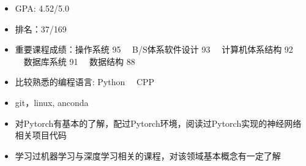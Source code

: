 

\begin{itemize}
  \item GPA: 4.52/5.0
  \item 排名：37/169
  \item 重要课程成绩：操作系统 95 \ \ B/S体系软件设计 93  \ \ 计算机体系结构 92 \ \ 数据库系统 91 \ \ 数据结构 88
\end{itemize}



\begin{itemize}[parsep=0.5ex]
  \item 比较熟悉的编程语言: Python \ \  CPP 
  \item git，linux, anconda
  \item 对Pytorch有基本的了解，配过Pytorch环境，阅读过Pytorch实现的神经网络相关项目代码
  \item 学习过机器学习与深度学习相关的课程，对该领域基本概念有一定了解
\end{itemize}

